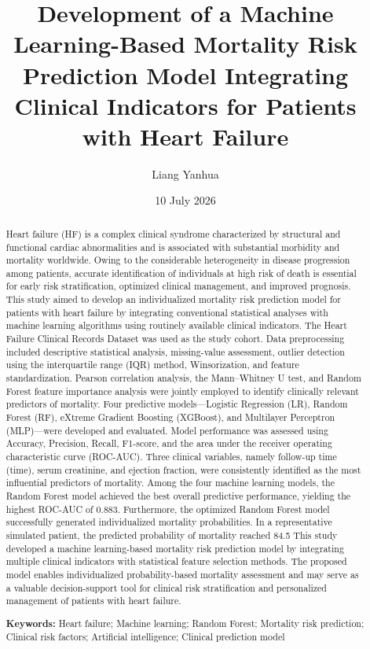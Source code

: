 \documentclass[12pt]{article}
\title{Development of a Machine Learning-Based Mortality Risk Prediction Model Integrating Clinical Indicators for Patients with Heart Failure}
\author{Liang Yanhua}
\date{10 July 2026}
\begin{document}
\maketitle

\begin{abstract}
Heart failure (HF) is a complex clinical syndrome characterized by structural and functional cardiac abnormalities and is associated with substantial morbidity and mortality worldwide. Owing to the considerable heterogeneity in disease progression among patients, accurate identification of individuals at high risk of death is essential for early risk stratification, optimized clinical management, and improved prognosis.
This study aimed to develop an individualized mortality risk prediction model for patients with heart failure by integrating conventional statistical analyses with machine learning algorithms using routinely available clinical indicators.
The Heart Failure Clinical Records Dataset was used as the study cohort. Data preprocessing included descriptive statistical analysis, missing-value assessment, outlier detection using the interquartile range (IQR) method, Winsorization, and feature standardization. Pearson correlation analysis, the Mann–Whitney U test, and Random Forest feature importance analysis were jointly employed to identify clinically relevant predictors of mortality. Four predictive models—Logistic Regression (LR), Random Forest (RF), eXtreme Gradient Boosting (XGBoost), and Multilayer Perceptron (MLP)—were developed and evaluated. Model performance was assessed using Accuracy, Precision, Recall, F1-score, and the area under the receiver operating characteristic curve (ROC-AUC).
Three clinical variables, namely follow-up time (time), serum creatinine, and ejection fraction, were consistently identified as the most influential predictors of mortality. Among the four machine learning models, the Random Forest model achieved the best overall predictive performance, yielding the highest ROC-AUC of 0.883. Furthermore, the optimized Random Forest model successfully generated individualized mortality probabilities. In a representative simulated patient, the predicted probability of mortality reached 84.5%
This study developed a machine learning-based mortality risk prediction model by integrating multiple clinical indicators with statistical feature selection methods. The proposed model enables individualized probability-based mortality assessment and may serve as a valuable decision-support tool for clinical risk stratification and personalized management of patients with heart failure.

\noindent\textbf{Keywords:}
Heart failure; Machine learning; Random Forest; Mortality risk prediction; Clinical risk factors; Artificial intelligence; Clinical prediction model
\end{abstract}
\end{document}
